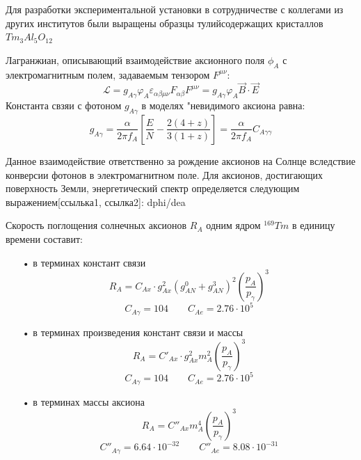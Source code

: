 \documentclass[a4paper,article,14pt]{extarticle}
\begin{document}
Для разработки экспериментальной установки в сотрудничестве с коллегами из других институтов были выращены образцы тулийсодержащих кристаллов $Tm_3Al_5O_{12}$



Лагранжиан, описывающий взаимодействие аксионного поля $\phi_A$ с электромагнитным полем, задаваемым тензором $F^{\mu \nu}$:
\begin{equation}
    \mathcal{L}  = {g_{A\gamma }}{\varphi _A}{\varepsilon _{\alpha \beta \mu \nu }}{F_{\alpha \beta }}{F^{\mu \nu }} = {g_{A\gamma }}{\varphi _A}\vec B \cdot \vec E
\end{equation}
Константа свзяи с фотоном $g_{A\gamma}$ в моделях "невидимого аксиона равна:
\begin{equation}
   {g_{A\gamma }} = \frac{\alpha }{{2\pi {f_A}}}\left[ {\frac{E}{N} - \frac{{2\left( {4 + z} \right)}}{{3\left( {1 + z} \right)}}} \right] = \frac{\alpha }{{2\pi {f_A}}}{C_{A\gamma \gamma }}
\end{equation}

Данное взаимодействие ответственно за рождение аксионов на Солнце вследствие конверсии фотонов в электромагнитном поле. Для аксионов, достигающих поверхность Земли, энергетический спектр определяется следующим выражением[ссылька1, ссылка2]:
dphi/dea

Скорость поглощения солнечных аксионов $R_A$ одним ядром $^{169}Tm$ в единицу времени составит:
\begin{enumerate}
    \item[•] в терминах констант связи
    \begin{equation}
    \label{RAg}
        {R_A} = {C_{Ax}} \cdot g_{Ax}^2{\left( {g_{AN}^0 + g_{AN}^3} \right)^2}{\left( {\frac{{{p_A}}}{{{p_\gamma }}}} \right)^3}
    \end{equation}
    \begin{equation}
        C_{A\gamma } = 104 \qquad C_{Ae} = 2.76 \cdot {10^5}
    \end{equation}
    \item[•] в терминах произведения констант связи и массы
    \begin{equation}
    \label{RAg}
        {R_A} = {C'_{Ax}} \cdot g_{Ax}^2 m_A^2{\left( {\frac{{{p_A}}}{{{p_\gamma }}}} \right)^3}
    \end{equation}
    \begin{equation}
        C_{A\gamma } = 104 \qquad C_{Ae} = 2.76 \cdot {10^5}
    \end{equation}
    \item[•] в терминах массы аксиона
    \begin{equation}
    \label{RAm}
   {R_A} = {C''_{Ax}}m_A^4{\left( {\frac{{{p_A}}}{{{p_\gamma }}}} \right)^3}
\end{equation}
\begin{equation}
        C''_{A\gamma } = 6.64 \cdot 10^{-32} \qquad C''_{Ae} = 8.08 \cdot 10^{-31}
    \end{equation}
\end{enumerate}
\end{document}
